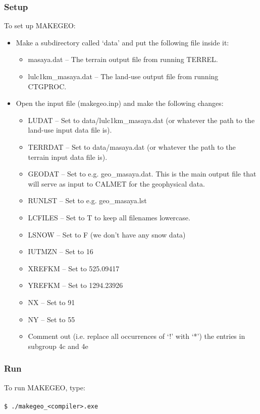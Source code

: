 \documentclass[10pt,a4paper]{article}
\newcommand\tab[1][0.5cm]{\hspace*{#1}}
\begin{document}
\subsubsection{Setup}
To set up MAKEGEO:
\begin{itemize}
\item Make a subdirectory called `data' and put the following file inside it:
\begin{itemize}
\item masaya.dat -- The terrain output file from running TERREL.
\item lulc1km\_masaya.dat -- The land-use output file from running CTGPROC.
\end{itemize}
\item Open the input file (makegeo.inp) and make the following changes:
\begin{itemize}
\item LUDAT -- Set to data/lulc1km\_masaya.dat (or whatever the path to the land-use input data file is).
\item TERRDAT -- Set to data/masaya.dat (or whatever the path to the terrain input data file is).
\item GEODAT -- Set to e.g. geo\_masaya.dat. This is the main output file that will serve as input to CALMET for the geophysical data.
\item RUNLST -- Set to e.g. geo\_masaya.lst
\item LCFILES -- Set to T to keep all filenames lowercase.
\item LSNOW -- Set to F (we don't have any snow data)
\item IUTMZN -- Set to 16
\item XREFKM -- Set to 525.09417
\item YREFKM -- Set to 1294.23926
\item NX -- Set to 91
\item NY -- Set to 55
\item Comment out (i.e. replace all occurrences of `!' with `*') the entries in subgroup 4c and 4e
\end{itemize}
\end{itemize}

\subsubsection{Run}
To run MAKEGEO, type:\\\\
\tab \texttt{\$ ./makegeo\_<compiler>.exe}
\end{document}
